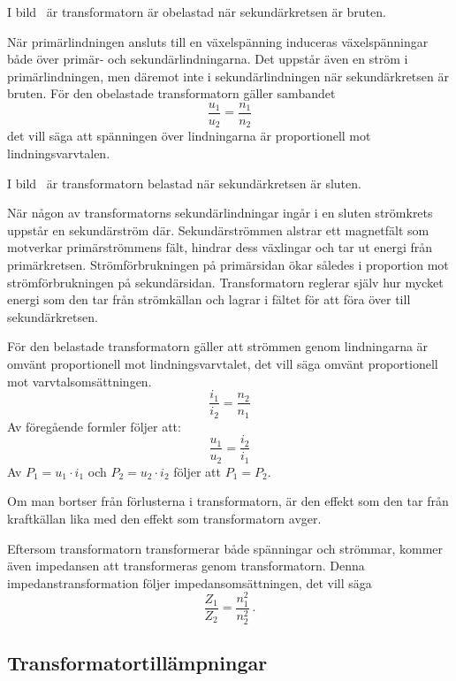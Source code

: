 
I bild~ är transformatorn är obelastad när sekundärkretsen
är bruten.

När primärlindningen ansluts till en växelspänning induceras växelspänningar
både över primär- och sekundärlindningarna.
Det uppstår även en ström i primärlindningen, men däremot inte i
sekundärlindningen när sekundärkretsen är bruten.
För den obelastade transformatorn gäller sambandet
\[\dfrac{u_1}{u_2} = \dfrac{n_1}{n_2}\]
det vill säga att spänningen över lindningarna är proportionell mot lindningsvarvtalen.

I bild~ är transformatorn belastad när sekundärkretsen
är sluten.

När någon av transformatorns sekundärlindningar ingår i en sluten strömkrets 
uppstår en sekundärström där.
%
Sekundärströmmen alstrar ett magnetfält som motverkar primärströmmens fält,
hindrar dess växlingar och tar ut energi från primärkretsen.
%
Strömförbrukningen på primärsidan ökar således i proportion mot
strömförbrukningen på sekundärsidan. Transformatorn reglerar själv hur mycket
energi som den tar från strömkällan och lagrar i fältet för att föra över
till sekundärkretsen.

\newpage
För den belastade transformatorn gäller att strömmen genom lindningarna är
omvänt proportionell mot lindningsvarvtalet, det vill säga omvänt proportionell 
mot varvtalsomsättningen.
\[\dfrac{i_1}{i_2} = \dfrac{n_2}{n_1}\]
Av föregående formler följer att:
\[\dfrac{u_1}{u_2} = \dfrac{i_2}{i_1}\]
Av \(P_1 = u_1 \cdot i_1\) och \(P_2 = u_2 \cdot i_2\) följer att \(P_1 = P_2\).

Om man bortser från förlusterna i transformatorn, är den effekt som den tar
från kraftkällan lika med den effekt som transformatorn avger.

Eftersom transformatorn transformerar både spänningar och strömmar, kommer
även impedansen att transformeras genom transformatorn.
Denna impedanstransformation följer impedansomsättningen, det vill säga
\[\dfrac{Z_1}{Z_2} = \dfrac{n_1^2}{n_2^2}~.\]

\newpage
\subsection{Transformatortillämpningar}

